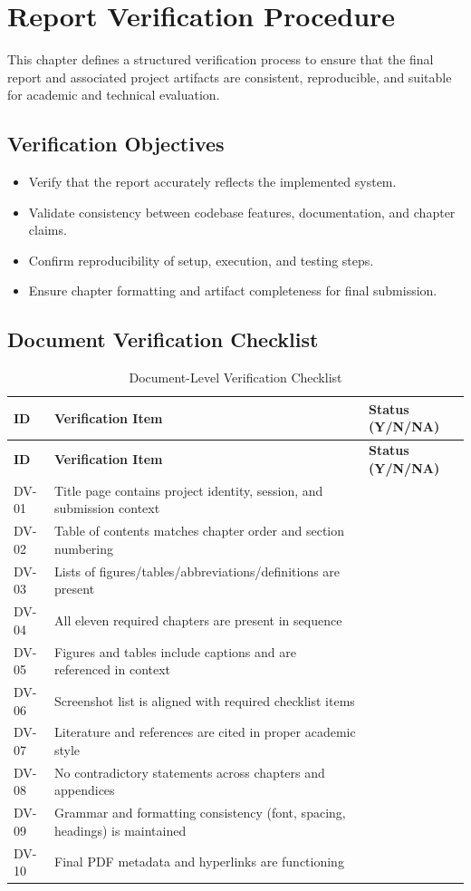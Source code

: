 \chapter{Report Verification Procedure}

This chapter defines a structured verification process to ensure that the final report and associated project artifacts are consistent, reproducible, and suitable for academic and technical evaluation.

\section{Verification Objectives}

\begin{itemize}
\item Verify that the report accurately reflects the implemented system.
\item Validate consistency between codebase features, documentation, and chapter claims.
\item Confirm reproducibility of setup, execution, and testing steps.
\item Ensure chapter formatting and artifact completeness for final submission.
\end{itemize}

\section{Document Verification Checklist}

\begin{longtable}{|p{}|p{}|p{}|}
\caption{Document-Level Verification Checklist}
\toprule
\textbf{ID} & \textbf{Verification Item} & \textbf{Status (Y/N/NA)} \\
\midrule
\endfirsthead
\toprule
\textbf{ID} & \textbf{Verification Item} & \textbf{Status (Y/N/NA)} \\
\midrule
\endhead
DV-01 & Title page contains project identity, session, and submission context \\
DV-02 & Table of contents matches chapter order and section numbering \\
DV-03 & Lists of figures/tables/abbreviations/definitions are present \\
DV-04 & All eleven required chapters are present in sequence \\
DV-05 & Figures and tables include captions and are referenced in context \\
DV-06 & Screenshot list is aligned with required checklist items \\
DV-07 & Literature and references are cited in proper academic style \\
DV-08 & No contradictory statements across chapters and appendices \\
DV-09 & Grammar and formatting consistency (font, spacing, headings) is maintained \\
DV-10 & Final PDF metadata and hyperlinks are functioning \\
\bottomrule
\end{longtable}

